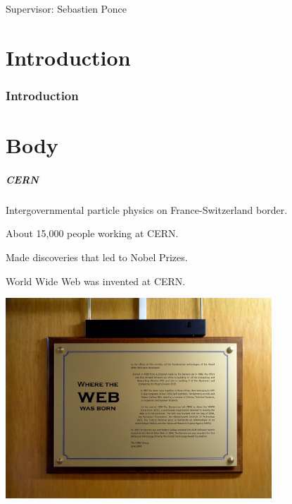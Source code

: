\documentclass{beamer}
\begin{document}
\begin{frame}
    \maketitle

    Supervisor: Sebastien Ponce
\end{frame}

\part{Introduction}
\section*{Introduction}
\part{Body}

    \begin{frame}
        \frametitle{CERN}

        Intergovernmental particle physics on France-Switzerland border.

        About  15,000 people working at CERN.

        Made discoveries that led to Nobel Prizes.

        World Wide Web was invented at CERN.
    \end{frame}

    \begin{frame}
        \includegraphics[width=0.75\textwidth]{WEB.jpg}
    \end{frame}
\end{document}
